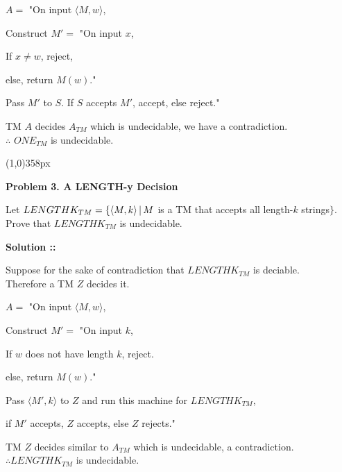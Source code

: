 \documentclass[11pt]{article}
\begin{document}
\vspace{5px}$A = $ "On input $\langle M, w\rangle$,

\hspace{30px}Construct $M' =$ "On input $x$,

\hspace{45px}If $x\ne w$, reject,

\hspace{45px}else, return $M(w)$."

\hspace{30px}Pass $M'$ to $S$. If $S$ accepts $M'$, accept, else reject."

\vspace{5px}TM $A$ decides $A_{TM}$ which is undecidable, we have a
contradiction. \\
$\therefore$ $ONE_{TM}$ is undecidable.

\line(1,0){358px}


\textbf{Problem 3. A LENGTH-y Decision}

Let $LENGTHK_{TM} = \\\{\langle M, k\rangle \,|\, M$ is a TM that accepts all
length-$k$ strings$\}$. \\
Prove that $LENGTHK_{TM}$ is undecidable.

\vspace{5px}\textbf{Solution ::}

Suppose for the sake of contradiction that $LENGTHK_{TM}$ is deciable.\\
Therefore a TM $Z$ decides it.

\vspace{5px}$A =$ "On input $\langle M, w\rangle$,

\hspace{30px}Construct $M' =$ "On input $k$,

\hspace{45px}If $w$ does not have length $k$, reject.

\hspace{45px}else, return $M(w)$."

\hspace{30px}Pass $\langle M', k\rangle$ to $Z$ and run this machine for
$LENGTHK_{TM}$, 

\hspace{30px}if $M'$ accepts, $Z$ accepts, else $Z$ rejects."

\vspace{5px}TM $Z$ decides similar to $A_{TM}$ which is undecidable, a contradiction. \\
$\therefore LENGTHK_{TM}$ is undecidable.
\end{document}
